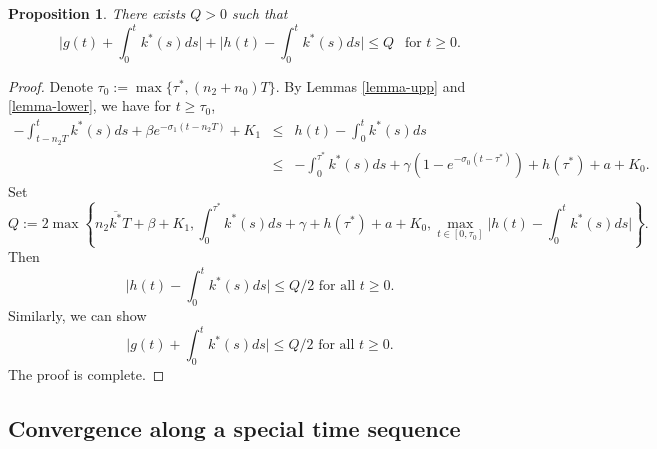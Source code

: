 \documentclass[11pt]{amsart}
\newtheorem{proposition}[theorem]{Proposition}
\numberwithin{equation}{section}
\begin{document}
\begin{proposition}\label{prop-bound}
  There exists $Q>0$ such that 
  \begin{equation}
     \Big|g(t)+\int_0^tk^*(s)ds\Big|+ \Big|h(t)-\int_0^tk^*(s)ds\Big|\leq Q ~~\text{ for } t\geq 0.
  \end{equation}
\end{proposition}
\begin{proof}
  Denote $\tau_0:=\max\{\tau^{*}, (n_2+n_0)T\}$. By Lemmas \ref{lemma-upp} and  \ref{lemma-lower}, we have for $t\geq \tau_0$,
  \begin{eqnarray*}
    -\int_{t-n_2T}^tk^*(s)ds+\beta e^{-\sigma_1(t-n_2T)}+K_1&\leq&  h(t)-\int_0^tk^*(s)ds\\
    &\leq& -\int_0^{\tau^*}k^*(s)ds+\gamma(1-e^{-\sigma_0(t-\tau^{*})})+h(\tau^*)+a+K_0.
  \end{eqnarray*}
Set 
\begin{equation*}
  Q:=2\max\left\{n_2\overline{k^*}T+\beta +K_1,\int_0^{\tau^*}k^*(s)ds+\gamma+h(\tau^*)+a+K_0, \max_{t\in[0,\tau_0]}\Big|h(t)-\int_0^tk^*(s)ds\Big|\right\}.
\end{equation*}
Then 
\begin{equation*}
  \Big|h(t)-\int_0^tk^*(s)ds\Big|\leq Q/2 \text{ for all }t\geq 0.
\end{equation*}
Similarly, we can show
\begin{equation*}
  \Big|g(t)+\int_0^tk^*(s)ds\Big|\leq Q/2 \text{ for all }t\geq 0.
\end{equation*}
The proof is complete.
\end{proof}



 
\subsection{Convergence along a special time sequence}
\end{document}
